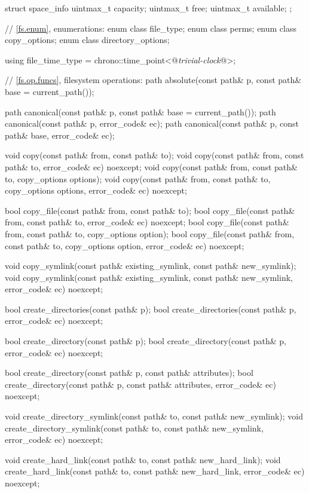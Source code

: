 \begin{codeblock}
{  struct space_info {
    uintmax_t capacity;
    uintmax_t free;
    uintmax_t available;
  };

  // \ref{fs.enum}, enumerations:
  enum class file_type;
  enum class perms;
  enum class copy_options;
  enum class directory_options;

  using file_time_type = chrono::time_point<@\textit{trivial-clock}@>;

  // \ref{fs.op.funcs}, filesystem operations:
  path absolute(const path& p, const path& base = current_path());

  path canonical(const path& p, const path& base = current_path());
  path canonical(const path& p, error_code& ec);
  path canonical(const path& p, const path& base, error_code& ec);

  void copy(const path& from, const path& to);
  void copy(const path& from, const path& to, error_code& ec) noexcept;
  void copy(const path& from, const path& to, copy_options options);
  void copy(const path& from, const path& to, copy_options options,
            error_code& ec) noexcept;

  bool copy_file(const path& from, const path& to);
  bool copy_file(const path& from, const path& to, error_code& ec) noexcept;
  bool copy_file(const path& from, const path& to, copy_options option);
  bool copy_file(const path& from, const path& to, copy_options option,
                 error_code& ec) noexcept;

  void copy_symlink(const path& existing_symlink, const path& new_symlink);
  void copy_symlink(const path& existing_symlink, const path& new_symlink,
                    error_code& ec) noexcept;

  bool create_directories(const path& p);
  bool create_directories(const path& p, error_code& ec) noexcept;

  bool create_directory(const path& p);
  bool create_directory(const path& p, error_code& ec) noexcept;

  bool create_directory(const path& p, const path& attributes);
  bool create_directory(const path& p, const path& attributes,
                        error_code& ec) noexcept;

  void create_directory_symlink(const path& to, const path& new_symlink);
  void create_directory_symlink(const path& to, const path& new_symlink,
                                error_code& ec) noexcept;

  void create_hard_link(const path& to, const path& new_hard_link);
  void create_hard_link(const path& to, const path& new_hard_link,
                        error_code& ec) noexcept;

}
\end{codeblock}
